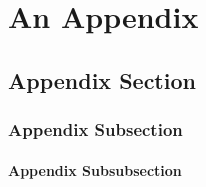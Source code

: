 \documentclass[thesis.tex]{subfiles}
\begin{document}
\chapter{An Appendix}
\lipsum[1-3]
\section{Appendix Section}
\lipsum[4-6]
\subsection{Appendix Subsection}
\lipsum[7-9]
\subsubsection{Appendix Subsubsection}
\lipsum[10-12]
\end{document}
